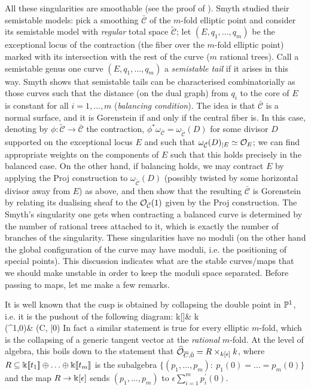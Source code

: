 All these singularities are smoothable (see the proof of \cite[Theorem 3.8]{SMY1}). Smyth studied their semistable models: pick a smoothing $\bar{\mathcal C}$ of the $m$-fold elliptic point and consider its semistable model with \emph{regular} total space $\tilde{\mathcal C}$; let $(E,q_1,\ldots,q_m)$ be the exceptional locus of the contraction (the fiber over the $m$-fold elliptic point) marked with its intersection with the rest of the curve ($m$ rational trees). Call a semistable genus one curve $(E,q_1,\ldots,q_m)$ a \emph{semistable tail} if it arises in this way. Smyth shows \cite[Proposition 2.12]{SMY1} that semistable tails can be characterised combinatorially as those curves such that the distance (on the dual graph) from $q_i$ to the core of $E$ is constant for all $i=1,\ldots,m$ (\emph{balancing condition}). The idea is that $\bar{\mathcal C}$ is a normal surface, and it is Gorenstein if and only if the central fiber is. In this case, denoting by $\phi\colon \tilde{\mathcal C}\to\bar{\mathcal C}$ the contraction, $\phi^*\omega_{\bar{\mathcal C}}=\omega_{\tilde{\mathcal C}}(D)$ for some divisor $D$ supported on the exceptional locus $E$ and such that $\omega_{\tilde{\mathcal C}}(D)_{|E}\simeq\mathcal{O}_E$; we can find appropriate weights on the components of $E$ such that this holds precisely in the balanced case. On the other hand, if balancing holds, we may contract $E$ by applying the Proj construction to $\omega_{\tilde{\mathcal C}}(D)$ (possibly twisted by some horizontal divisor away from $E$) as above, and then show that the resulting $\bar{\mathcal C}$ is Gorenstein by relating its dualising sheaf to the $\mathcal{O}_{\bar{\mathcal C}}(1)$ given by the Proj construction. The Smyth's singularity one gets when contracting a balanced curve is determined by the number of rational trees attached to it,  which is exactly the number of branches of the singularity. These singularities have no moduli (on the other hand the global configuration of the curve may have moduli, i.e. the positioning of special points). This discussion indicates what are the stable curves/maps that we should make unstable in order to keep the moduli space separated. Before passing to maps, let me make a few remarks.

\begin{rmk}
 It is well known that the cusp is obtained by collapsing the double point in $\mathbb P^1$, i.e. it is the pushout of the following diagram:
 \bcd
 \Spec k[\epsilon]\ar[r]\ar[d] & \Spec k\ar[d] \\
 (\PP^1,0)\ar[r] & (\overline C, \bar 0)
 \ecd
 In fact a similar statement is true for every elliptic $m$-fold, which is the collapsing of a generic tangent vector at the \emph{rational} $m$-fold. At the level of algebra, this boils down to the statement that $\widehat{\mathcal{O}}_{\overline C,\bar 0}= R\times_{k[\epsilon]} k$, where $R\subseteq \Bbbk[\![t_1]\!]\oplus\ldots\oplus \Bbbk[\![t_m]\!]$ is the subalgebra $\{(p_1,\ldots,p_m):\ p_1(0)=\ldots=p_m(0)\}$ and the map $R\rightarrow \Bbbk[\epsilon]$ sends $(p_1,\ldots,p_m)$ to $\epsilon\sum_{i=1}^m p_i^\prime(0)$.
\end{rmk}

